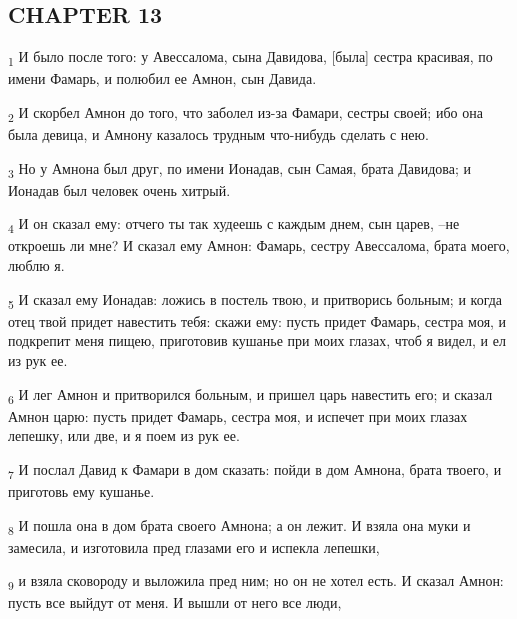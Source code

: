 \subsection{CHAPTER 13}
\begin{tcolorbox}
\textsubscript{1} И было после того: у Авессалома, сына Давидова, [была] сестра красивая, по имени Фамарь, и полюбил ее Амнон, сын Давида.
\end{tcolorbox}
\begin{tcolorbox}
\textsubscript{2} И скорбел Амнон до того, что заболел из-за Фамари, сестры своей; ибо она была девица, и Амнону казалось трудным что-нибудь сделать с нею.
\end{tcolorbox}
\begin{tcolorbox}
\textsubscript{3} Но у Амнона был друг, по имени Ионадав, сын Самая, брата Давидова; и Ионадав был человек очень хитрый.
\end{tcolorbox}
\begin{tcolorbox}
\textsubscript{4} И он сказал ему: отчего ты так худеешь с каждым днем, сын царев, --не откроешь ли мне? И сказал ему Амнон: Фамарь, сестру Авессалома, брата моего, люблю я.
\end{tcolorbox}
\begin{tcolorbox}
\textsubscript{5} И сказал ему Ионадав: ложись в постель твою, и притворись больным; и когда отец твой придет навестить тебя: скажи ему: пусть придет Фамарь, сестра моя, и подкрепит меня пищею, приготовив кушанье при моих глазах, чтоб я видел, и ел из рук ее.
\end{tcolorbox}
\begin{tcolorbox}
\textsubscript{6} И лег Амнон и притворился больным, и пришел царь навестить его; и сказал Амнон царю: пусть придет Фамарь, сестра моя, и испечет при моих глазах лепешку, или две, и я поем из рук ее.
\end{tcolorbox}
\begin{tcolorbox}
\textsubscript{7} И послал Давид к Фамари в дом сказать: пойди в дом Амнона, брата твоего, и приготовь ему кушанье.
\end{tcolorbox}
\begin{tcolorbox}
\textsubscript{8} И пошла она в дом брата своего Амнона; а он лежит. И взяла она муки и замесила, и изготовила пред глазами его и испекла лепешки,
\end{tcolorbox}
\begin{tcolorbox}
\textsubscript{9} и взяла сковороду и выложила пред ним; но он не хотел есть. И сказал Амнон: пусть все выйдут от меня. И вышли от него все люди,
\end{tcolorbox}
